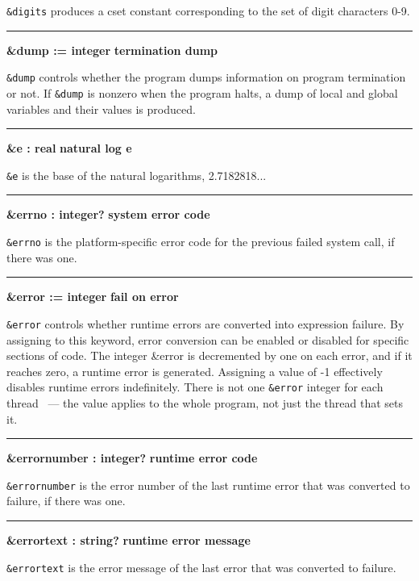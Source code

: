 \noindent
{}\texttt{\&digits} produces a cset constant
corresponding to the set of digit characters 0-9.

\bigskip\hrule\vspace{0.1cm}
\noindent
{\bf \&dump := integer } \hfill {\bf termination dump}

\noindent
\texttt{\&dump} controls whether the program dumps information on
program termination or not. If \texttt{\&dump} is nonzero when the
program halts, a dump of local and global variables and their values is
produced.

\bigskip\hrule\vspace{0.1cm}
\noindent
{\bf \&e : real } \hfill {\bf natural log e}

\noindent
{}\texttt{\&e} is the base of the natural
logarithms, 2.7182818...

\bigskip\hrule\vspace{0.1cm}
\noindent
{\bf \&errno : integer? } \hfill {\bf system error code}

\noindent
\texttt{\&errno} is the platform-specific error code for the previous
failed system call, if there was one.

\bigskip\hrule\vspace{0.1cm}
\noindent
{\bf \&error := integer } \hfill {\bf fail on error}

\noindent
{}\texttt{\&error} controls whether
runtime errors are converted into expression failure. By assigning to
this keyword, error conversion can be enabled or disabled for specific
sections of code. The integer \&error is decremented by one on each
error, and if it reaches zero, a runtime error is generated. Assigning
a value of -1 effectively disables runtime errors indefinitely. 
There is not one \texttt{\&error} integer for each thread \ConcurrencyIssue\
--- the value applies to the whole program, not just the thread that sets it.

\bigskip\hrule\vspace{0.1cm}
\noindent
{\bf \&errornumber : integer? } \hfill {\bf runtime error code}

\noindent
\texttt{\&errornumber} is the error number of the last runtime error
that was converted to failure, if there was one.

\bigskip\hrule\vspace{0.1cm}
\noindent
{\bf \&errortext : string? } \hfill {\bf runtime error message}

\noindent
{}\texttt{\&errortext} is the error
message of the last error that was converted to failure.

